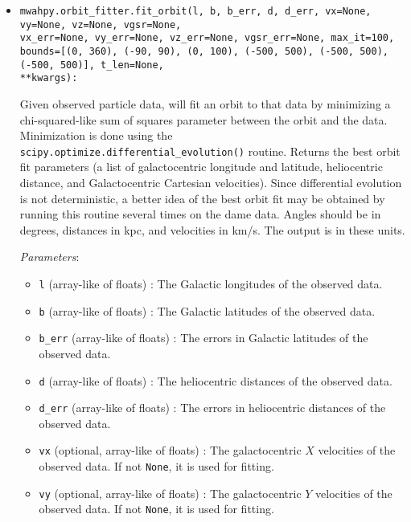 \documentclass{article}
\begin{document}
\begin{itemize}

\item \verb!mwahpy.orbit_fitter.fit_orbit(l, b, b_err, d, d_err, vx=None, vy=None, vz=None, vgsr=None,!\\ \verb!vx_err=None, vy_err=None, vz_err=None, vgsr_err=None, max_it=100,!\\ \verb!bounds=[(0, 360), (-90, 90), (0, 100), (-500, 500), (-500, 500), (-500, 500)], t_len=None,!\\ \verb!**kwargs):!

Given observed particle data, will fit an orbit to that data by minimizing a chi-squared-like sum of squares parameter between the orbit and the data. Minimization is done using the \\ \verb!scipy.optimize.differential_evolution()! routine.  Returns the best orbit fit parameters (a list of galactocentric longitude and latitude, heliocentric distance, and Galactocentric Cartesian velocities). Since differential evolution is not deterministic, a better idea of the best orbit fit may be obtained by running this routine several times on the dame data. Angles should be in degrees, distances in kpc, and velocities in km/s. The output is in these units. 

\textit{Parameters}: \begin{itemize}

\item \verb!l! (array-like of floats) : The Galactic longitudes of the observed data. 

\item \verb!b! (array-like of floats) : The Galactic latitudes of the observed data. 

\item \verb!b_err! (array-like of floats) : The errors in Galactic latitudes of the observed data. 

\item \verb!d! (array-like of floats) : The heliocentric distances of the observed data. 

\item \verb!d_err! (array-like of floats) : The errors in heliocentric distances of the observed data. 

\item \verb!vx! (optional, array-like of floats) : The galactocentric $X$ velocities of the observed data. If not \verb!None!, it is used for fitting. 

\item \verb!vy! (optional, array-like of floats) : The galactocentric $Y$ velocities of the observed data. If not \verb!None!, it is used for fitting. 


\end{itemize}
\end{itemize}
\end{document}
